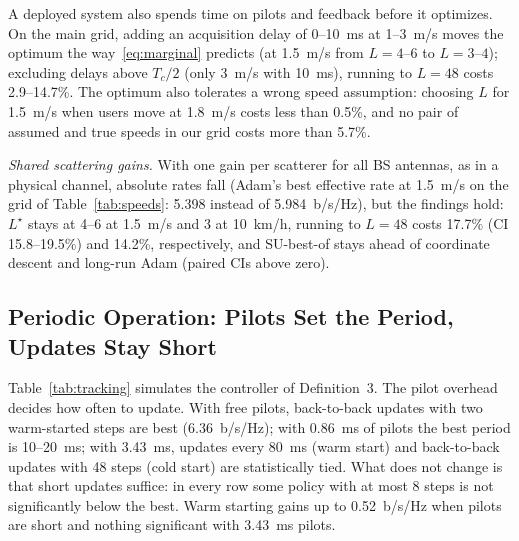 A deployed system also spends time on pilots and feedback before it optimizes. On the main grid, adding an acquisition delay of 0--10~ms at 1--3~m/s moves the optimum the way~\eqref{eq:marginal} predicts (at 1.5~m/s from $L=4$--$6$ to $L=3$--$4$); excluding delays above $T_c/2$ (only 3~m/s with 10~ms), running to $L=48$ costs 2.9--14.7\%. The optimum also tolerates a wrong speed assumption: choosing $L$ for 1.5~m/s when users move at 1.8~m/s costs less than 0.5\%, and no pair of assumed and true speeds in our grid costs more than 5.7\%.

\emph{Shared scattering gains.} With one gain per scatterer for all BS antennas, as in a physical channel, absolute rates fall (Adam's best effective rate at 1.5~m/s on the grid of Table~\ref{tab:speeds}: 5.398 instead of 5.984~b/s/Hz), but the findings hold: $L^\star$ stays at 4--6 at 1.5~m/s and 3 at 10~km/h, running to $L=48$ costs 17.7\% (CI 15.8--19.5\%) and 14.2\%, respectively, and SU-best-of stays ahead of coordinate descent and long-run Adam (paired CIs above zero).

\subsection{Periodic Operation: Pilots Set the Period, Updates Stay Short}
\label{sec:res_tracking}
Table~\ref{tab:tracking} simulates the controller of Definition~3. The pilot overhead decides how often to update. With free pilots, back-to-back updates with two warm-started steps are best (6.36~b/s/Hz); with 0.86~ms of pilots the best period is 10--20~ms; with 3.43~ms, updates every 80~ms (warm start) and back-to-back updates with 48 steps (cold start) are statistically tied. What does not change is that short updates suffice: in every row some policy with at most 8 steps is not significantly below the best. Warm starting gains up to 0.52~b/s/Hz when pilots are short and nothing significant with 3.43~ms pilots.

\begin{table}[t]
\centering
\caption{Periodic re-optimization (aging set): best update period $U$ (ms; b2b = back-to-back) and steps per update $L$, with the time-averaged effective rate (b/s/Hz) for pilot durations $T_{\mathrm{p}}$. Warm$-$cold: paired difference of the two best policies; $^\S$not significant.}
\label{tab:tracking}
\footnotesize
\setlength{\tabcolsep}{5.5pt}

\end{table}

